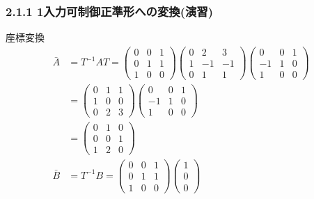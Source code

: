 \begin{frame}[t]
\frametitle{2.1.1 1入力可制御正準形への変換(演習)}

座標変換
\begin{align*}
	\bar{A}
	& = T^{-1} A T
	=
	\left(\begin{array}{ccc}
	     0 & 0 & 1  \\
	     0 & 1 & 1  \\
	     1 & 0 & 0
	\end{array}\right)
	\left(\begin{array}{ccc}
	     0      & 2      & 3     \\
	     1      & -1     & -1    \\
	     0      & 1      & 1     
	\end{array}\right)
	\left(\begin{array}{ccc}
	     0  & 0 & 1  \\
	     -1 & 1 & 0  \\
	     1  & 0 & 0
	\end{array}\right)
\\
	&=
	\left(\begin{array}{ccc}
	     0 & 1 & 1  \\
	     1 & 0 & 0  \\
	     0 & 2 & 3
	\end{array}\right)
	\left(\begin{array}{ccc}
	     0  & 0 & 1  \\
	     -1 & 1 & 0  \\
	     1  & 0 & 0
	\end{array}\right)
\\
	&=
	\left(\begin{array}{ccc}
	     0  & 1 & 0  \\
	     0  & 0 & 1  \\
	     1  & 2 & 0
	\end{array}\right)
\\
	\bar{B}
	& = T^{-1} B
	=
	\left(\begin{array}{ccc}
	     0 & 0 & 1  \\
	     0 & 1 & 1  \\
	     1 & 0 & 0
	\end{array}\right)
	\left(\begin{array}{c}
	     1 \\
	     0 \\
	     0 
	\end{array}\right)

\end{align*}
\end{frame}
